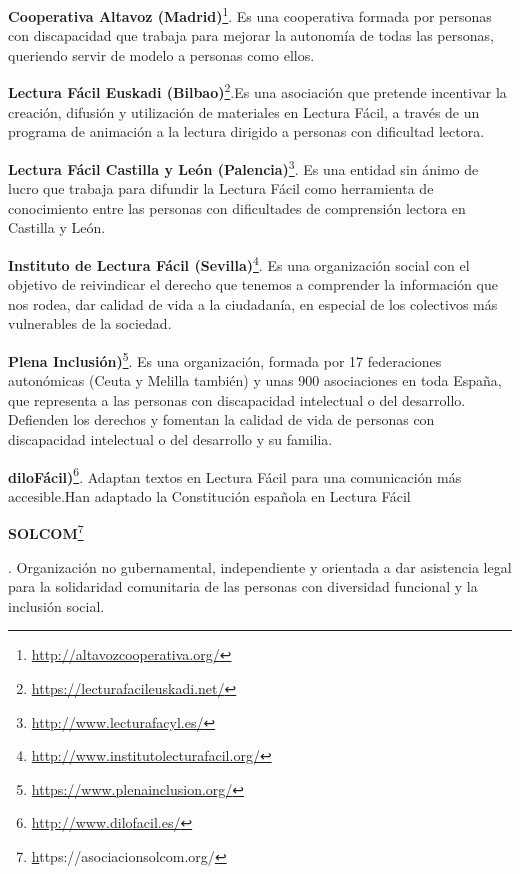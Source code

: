 \begin{itemize}
{{	\item{\textbf{Cooperativa Altavoz (Madrid)}\footnote{\href{http://altavozcooperativa.org/}{http://altavozcooperativa.org/}}}. Es una cooperativa formada por personas con discapacidad
	que trabaja para mejorar la autonomía de todas las personas, queriendo servir de modelo a personas como ellos.
	
	\item{\textbf{Lectura Fácil Euskadi (Bilbao)}\footnote{\href{https://lecturafacileuskadi.net/}{https://lecturafacileuskadi.net/}}}.Es una asociación que pretende incentivar la creación, difusión y utilización de materiales en Lectura Fácil, a través de un programa de animación a la lectura dirigido a personas con dificultad lectora.
	
	\item{\textbf{Lectura Fácil Castilla y León (Palencia)}\footnote{\href{http://www.lecturafacyl.es/}{http://www.lecturafacyl.es/}}}. Es una entidad sin ánimo de lucro que trabaja para difundir la Lectura Fácil como herramienta de conocimiento entre las personas con dificultades de comprensión lectora en Castilla y León.
	
	\item{\textbf{Instituto de Lectura Fácil (Sevilla)}\footnote{\href{http://www.institutolecturafacil.org/}{http://www.institutolecturafacil.org/}}}. Es una organización social con el objetivo de reivindicar el derecho que tenemos a comprender la información que nos rodea, dar calidad de vida a la ciudadanía, en especial de los colectivos más vulnerables de la sociedad.
	
		\item{\textbf{Plena Inclusión)}\footnote{\href{https://www.plenainclusion.org/}{https://www.plenainclusion.org/}}}. Es una organización, formada por 17 federaciones autonómicas (Ceuta y Melilla también) y unas 900 asociaciones en toda España, que representa a las personas con discapacidad intelectual o del desarrollo.	Defienden los derechos y fomentan la calidad de vida de personas con discapacidad intelectual o del desarrollo y su familia. 
		
	\item{\textbf{diloFácil)}\footnote{\href{http://www.dilofacil.es/}{http://www.dilofacil.es/}}}. Adaptan textos en Lectura Fácil para una comunicación más accesible.Han adaptado la Constitución española en Lectura Fácil
	
		\item{\textbf{SOLCOM}}\footnote{\href{https://asociacionsolcom.org/}https://asociacionsolcom.org/}}}. Organización no gubernamental, independiente y orientada a dar asistencia legal para la solidaridad comunitaria de las personas con diversidad funcional y la inclusión social.
		
\end{itemize}

